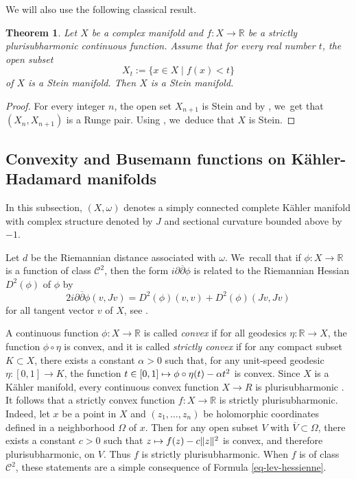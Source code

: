 \documentclass[11pt]{article}
\newcommand{\Subsection}{\subsection}
\newcommand\mto{\mathchoice{\longmapsto}{\mapsto}{\mapsto}{\mapsto}}
\newtheorem*{theorem*}{Theorem}
\theoremstyle{definition}
\newcommand{\R}{\mathbb{R}}
\begin{document}
We will also use the following classical result.

\begin{theorem*}\label{thm-docquier-grauert}
Let $X$ be a complex manifold and $f:X\to \R$ be a strictly plurisubharmonic continuous function. Assume that for every real number $t$, the open subset
\begin{equation*}
X_t:= \{x\in X\mid f(x)<t\}
\end{equation*}
of $X$ is a Stein manifold. Then $X$ is a Stein manifold.
\end{theorem*}

\begin{proof}
For every integer $n$, the open set $X_{n+1}$ is Stein and by \cite[Cor.\,1]{narasimhanLeviProblemComplex1962}, we~get that $(X_{n},X_{n+1})$ is a Runge pair. Using \cite[Satz 1.3]{steinUberlagerungenHolomorphvollstandigerKomplexer1956}, we~deduce that $X$ is Stein.
\end{proof}

\Subsection{Convexity and Busemann functions on Kähler-Hadamard manifolds}

In this subsection, $(X,\omega)$ denotes a simply connected complete Kähler manifold with complex structure denoted by $J$ and sectional curvature bounded above by $-1$.

Let $d$ be the Riemannian distance associated with $\omega$. We~recall that if $\phi:X\to \R$ is a function of class $\mathcal{C}^2$, then the form $i\partial\overline{\partial}\phi$ is related to the Riemannian Hessian $D^{2}(\phi)$ of $\phi$ by \begin{equation}\label{eq-lev-hessienne}
2i\partial\overline{\partial}\phi(v,Jv)=D^{2}(\phi)(v,v)+D^{2}(\phi)(Jv,Jv)
\end{equation}
for all tangent vector $v$ of $X$, see \cite{greeneSubharmonicityPlurisubharmonicityGeodesically1973}.

A continuous function $\phi:X\to \R$ is called \textit{convex} if for all geodesics $\eta:\R\to X$, the function $\phi\circ\eta$ is convex, and it is called \textit{strictly convex} if for any compact subset \hbox{$K\!\subset\! X$}, there exists a constant $\alpha>0$ such that, for any unit-speed geodesic \hbox{$\eta:[0,1]\to K$}, the function $t\in [0,1]\mto \phi\circ\eta(t)-\alpha t^{2}$ is convex. Since $X$ is a Kähler manifold, every continuous convex function $X\to R$ is plurisubharmonic \cite[Th.\,3]{greeneSubharmonicityPlurisubharmonicityGeodesically1973}. It follows that a strictly convex function $f:X\to \R$ is strictly plurisubharmonic. Indeed, let $x$ be a point in $X$ and $(z_1,\dots,z_n)$ be holomorphic coordinates defined in a neighborhood $\Omega$ of $x$. Then for any open subset $V$ with $\overline{V}\subset \Omega$, there exists a constant $c>0$ such that $z\mto f(z)-c\lVert z\rVert^{2}$ is convex, and therefore plurisubharmonic, on $V$. Thus $f$ is strictly plurisubharmonic. When $f$ is of class $\mathcal{C}^2$, these statements are a simple consequence of Formula \eqref{eq-lev-hessienne}.
\end{document}
